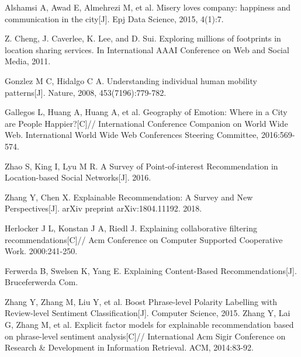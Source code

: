 \documentclass[runningheads]{llncs}
\begin{document}
\begin{thebibliography}{25}
Alshamsi A, Awad E, Almehrezi M, et al. Misery loves company: happiness and communication in the city[J]. Epj Data Science, 2015, 4(1):7.

Z. Cheng, J. Caverlee, K. Lee, and D. Sui. Exploring millions of footprints in location sharing services. In International AAAI Conference on Web and Social Media, 2011.

Gonzlez M C, Hidalgo C A. Understanding individual human mobility patterns[J]. Nature, 2008, 453(7196):779-782.

Gallegos L, Huang A, Huang A, et al. Geography of Emotion: Where in a City are People Happier?[C]// International Conference Companion on World Wide Web. International World Wide Web Conferences Steering Committee, 2016:569-574.

Zhao S, King I, Lyu M R. A Survey of Point-of-interest Recommendation in Location-based Social Networks[J]. 2016.

 Zhang Y, Chen X. Explainable Recommendation: A Survey and New Perspectives[J]. arXiv preprint arXiv:1804.11192. 2018.
  
 Herlocker J L, Konstan J A, Riedl J. Explaining collaborative filtering recommendations[C]// Acm Conference on Computer Supported Cooperative Work. 2000:241-250.
 
 Ferwerda B, Swelsen K, Yang E. Explaining Content-Based Recommendations[J]. Bruceferwerda Com.
 
  Zhang Y, Zhang M, Liu Y, et al. Boost Phrase-level Polarity Labelling with Review-level Sentiment Classification[J]. Computer Science, 2015.
    Zhang Y, Lai G, Zhang M, et al. Explicit factor models for explainable recommendation based on phrase-level sentiment analysis[C]// International Acm Sigir Conference on Research \& Development in Information Retrieval. ACM, 2014:83-92.


\end{thebibliography}
\end{document}
